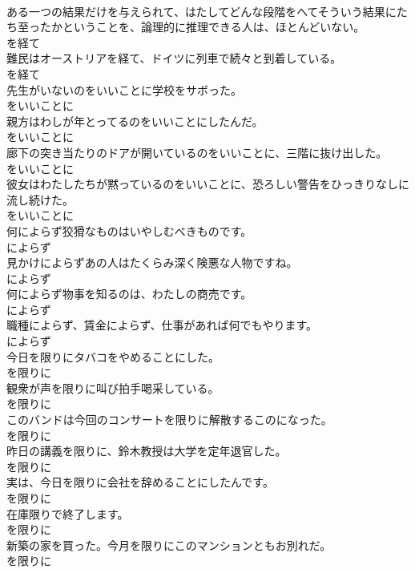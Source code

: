\documentclass[8pt]{extreport}
\begin{document}
\begin{CJK}{UTF8}{min}
\\	ある一つの結果だけを与えられて、はたしてどんな段階をへてそういう結果にたち至ったかということを、論理的に推理できる人は、ほとんどいない。	
\\	を経て
\\	難民はオーストリアを経て、ドイツに列車で続々と到着している。	
\\	を経て
\\	先生がいないのをいいことに学校をサボった。	
\\	をいいことに
\\	親方はわしが年とってるのをいいことにしたんだ。	
\\	をいいことに
\\	廊下の突き当たりのドアが開いているのをいいことに、三階に抜け出した。	
\\	をいいことに
\\	彼女はわたしたちが黙っているのをいいことに、恐ろしい警告をひっきりなしに流し続けた。	
\\	をいいことに
\\	何によらず狡猾なものはいやしむべきものです。	
\\	によらず
\\	見かけによらずあの人はたくらみ深く険悪な人物ですね。	
\\	によらず
\\	何によらず物事を知るのは、わたしの商売です。	
\\	によらず
\\	職種によらず、賃金によらず、仕事があれば何でもやります。	
\\	によらず
\\	今日を限りにタバコをやめることにした。	
\\	を限りに
\\	観衆が声を限りに叫び拍手喝采している。	
\\	を限りに
\\	このバンドは今回のコンサートを限りに解散するこのになった。	
\\	を限りに
\\	昨日の講義を限りに、鈴木教授は大学を定年退官した。	
\\	を限りに
\\	実は、今日を限りに会社を辞めることにしたんです。	
\\	を限りに
\\	在庫限りで終了します。	
\\	を限りに
\\	新築の家を買った。今月を限りにこのマンションともお別れだ。	
\\	を限りに

\end{CJK}
\end{document}
